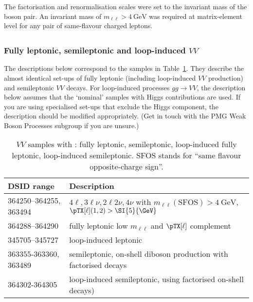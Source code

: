 The factorisation and renormalisation scales were set to the invariant mass of
the boson pair. An invariant mass of $m_{\ell\ell} > \SI{4}{\GeV}$ was required
at matrix-element level for any pair of same-flavour charged leptons.


\subsection[Sherpa]{\SHERPA}

\subsubsection{Fully leptonic, semileptonic and loop-induced \texorpdfstring{$VV$}{VV}}

The descriptions below correspond to the samples in
Table~\ref{tab:MB-sherpa}. They describe the almost
identical set-ups of fully leptonic (including loop-induced $VV$ production)
and semileptonic $VV$ decays. For loop-induced processes $gg\to VV$, 
the description below assumes that the `nominal' samples with 
Higgs contributions are used. If you are using specialised set-ups that
exclude the Higgs component, the description should be modified appropriately.
(Get in touch with the PMG Weak Boson Processes subgroup if you are unsure.)

\begin{table}[htbp]
  \caption{$VV$ samples with \SHERPA: fully leptonic, semileptonic,
    loop-induced fully leptonic, loop-induced semileptonic. SFOS stands for
    \enquote{same flavour opposite-charge sign}.}%
  \label{tab:MB-sherpa}
  \centering
  \begin{tabular}{l l}
    \toprule
    DSID range & Description \\
    \midrule
    364250--364255, 363494   & $4\ell, 3\ell\nu, 2\ell 2\nu, 4\nu$ with $m_{\ell\ell}\mathrm{(SFOS)} > \SI{4}{\GeV}$, $\pTX[\ell](1,2) > \SI{5}{\GeV}$\\
    364288--364290 & fully leptonic low $m_{\ell\ell}$ and $\pTX[\ell]$ complement\\
    \midrule
    345705--345727   & loop-induced leptonic\\
    \midrule
    363355-363360, 363489   & semileptonic, on-shell diboson production with factorised decays\\
    \midrule
    364302-364305   & loop-induced semileptonic, using factorised on-shell decays)\\
    \bottomrule
  \end{tabular}
\end{table}

